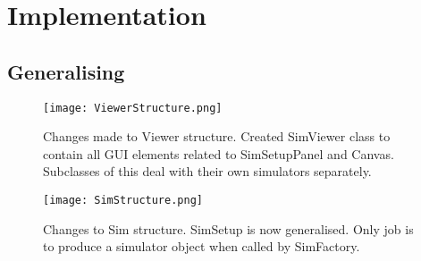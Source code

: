 \chapter{Implementation}
\label{cha:Implementation}

\section{Generalising}
\label{sec:Generalising}

\begin{figure}[htb]
\texttt{[image: ViewerStructure.png]}
\caption{Changes made to Viewer structure. Created SimViewer class to contain all GUI elements related to SimSetupPanel and Canvas. Subclasses of this deal with their own simulators separately.}
\end{figure}

\begin{figure}[htb]
\texttt{[image: SimStructure.png]}
\caption{Changes to Sim structure. SimSetup is now generalised. Only job is to produce a simulator object when called by SimFactory.}
\end{figure}